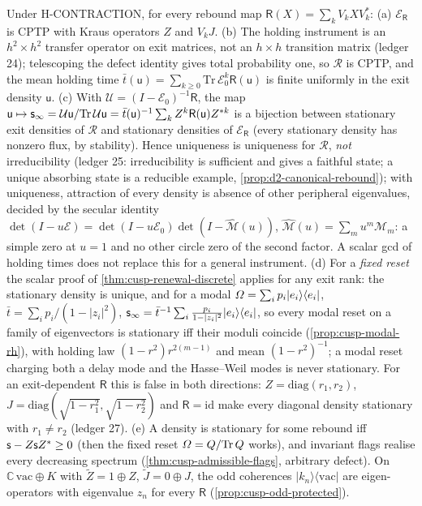 \begin{theorem}
\label{thm:h-exit-renewal}
Under H-CONTRACTION, for every rebound map $\mathsf R(X) = \sum_k V_k XV_k^{*}$:
(a) $\mathcal E_{\mathsf R}$ is CPTP with Kraus operators $Z$ and $V_k J$.
(b) The holding instrument is an $h^2\times h^2$ transfer operator on exit matrices, not an $h\times h$
transition matrix (ledger 24); telescoping the defect identity gives total probability one, so $\mathcal R$ is
CPTP, and the mean holding time $\bar t(\mathsf u) = \sum_{k\ge0}\mathrm{Tr}\,\mathcal E_0^k\mathsf R(\mathsf u)$ is finite uniformly
in the exit density $\mathsf u$.
(c) With $\mathcal U = (I-\mathcal E_0)^{-1}\mathsf R$, the map $\mathsf u\mapsto\mathsf s_\infty = \mathcal U\mathsf u/\mathrm{Tr}\,\mathcal U\mathsf u
= \bar t(\mathsf u)^{-1}\sum_kZ^k\mathsf R(\mathsf u)Z^{*k}$ is a bijection between stationary exit densities of $\mathcal R$ and
stationary densities of $\mathcal E_{\mathsf R}$ (every stationary density has nonzero flux, by stability). Hence
uniqueness is uniqueness for $\mathcal R$, \emph{not} irreducibility (ledger 25: irreducibility is sufficient and gives a
faithful state; a unique absorbing state is a reducible example, \cref{prop:d2-canonical-rebound}); with
uniqueness, attraction of every density is absence of other peripheral eigenvalues, decided by the secular
identity $\det(I-u\mathcal E) = \det(I-u\mathcal E_0)\det(I-\widehat{\mathcal M}(u))$, $\widehat{\mathcal M}(u) =
\sum_mu^m\mathcal M_m$: a simple zero at $u = 1$ and no other circle zero of the second factor. A scalar gcd of
holding times does not replace this for a general instrument.
(d) For a \emph{fixed reset} the scalar proof of \cref{thm:cusp-renewal-discrete} applies for any exit rank:
the stationary density is unique, and for a modal $\varOmega = \sum_ip_i|e_i\rangle\langle e_i|$,
$\bar t = \sum_ip_i/(1-|z_i|^2)$, $\mathsf s_\infty = \bar t^{-1}\sum_i\frac{p_i}{1-|z_i|^2}|e_i\rangle\langle e_i|$, so every
modal reset on a family of eigenvectors is stationary iff their moduli coincide (\cref{prop:cusp-modal-rh}),
with holding law $(1-r^2)r^{2(m-1)}$ and mean $(1-r^2)^{-1}$; a modal reset charging both a delay mode and the
Hasse--Weil modes is never stationary. For an exit-dependent $\mathsf R$ this is false in both directions:
$Z = \mathrm{diag}(r_1,r_2)$, $J = \mathrm{diag}(\sqrt{1-r_1^2},\sqrt{1-r_2^2})$ and $\mathsf R = \mathrm{id}$ make every
diagonal density stationary with $r_1\ne r_2$ (ledger 27).
(e) A density is stationary for some rebound iff $\mathsf s-Z\mathsf s Z^{*}\ge0$ (then the fixed reset
$\varOmega = Q/\mathrm{Tr}\,Q$ works), and invariant flags realise every decreasing spectrum
(\cref{thm:cusp-admissible-flags}, arbitrary defect). On $\mathbb C\,\mathrm{vac}\oplus K$ with $\tilde Z = 1\oplus Z$,
$\tilde J = 0\oplus J$, the odd coherences $|k_n\rangle\langle\mathrm{vac}|$ are eigen-operators with eigenvalue $z_n$
for every $\mathsf R$ (\cref{prop:cusp-odd-protected}).
\end{theorem}

